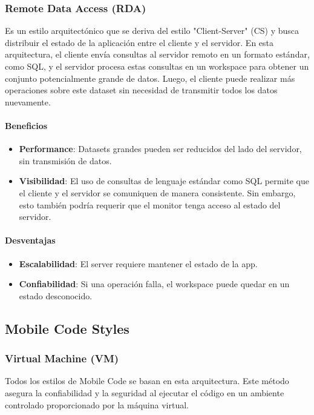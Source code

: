 \documentclass{article}
\begin{document}
		
		\subsubsection{Remote Data Access (RDA)}
		Es un estilo arquitectónico que se deriva del estilo "Client-Server" (CS) y busca distribuir el estado de la aplicación entre el cliente y el servidor. En esta arquitectura, el cliente envía consultas al servidor remoto en un formato estándar, como SQL, y el servidor procesa estas consultas en un workspace para obtener un conjunto potencialmente grande de datos. Luego, el cliente puede realizar más operaciones sobre este dataset sin necesidad de transmitir todos los datos nuevamente.
		\paragraph{Beneficios}
		\begin{itemize}	
			\item {\textbf{Performance}}: Datasets grandes pueden ser reducidos del lado del
			servidor, sin transmisión de datos.
			
			\item {\textbf{Visibilidad}}: El uso de consultas de lenguaje estándar como SQL permite que el cliente y el servidor se comuniquen de manera consistente. Sin embargo, esto también podría requerir que el monitor tenga acceso al estado del servidor.
			
		\end{itemize}
		
		\paragraph{Desventajas}
		\begin{itemize}	
			\item {\textbf{Escalabilidad}}: El server requiere mantener el estado de la app.
			
			\item {\textbf{Confiabilidad}}: Si una operación falla, el workspace puede quedar en un estado desconocido.
			
		\end{itemize}
		
		
		\subsection{Mobile Code Styles}
		\subsubsection{Virtual Machine (VM)}
		Todos los estilos de Mobile Code se basan en esta arquitectura. Este método asegura la confiabilidad y la seguridad al ejecutar el código en un ambiente controlado proporcionado por la máquina virtual.
		
\end{document}
